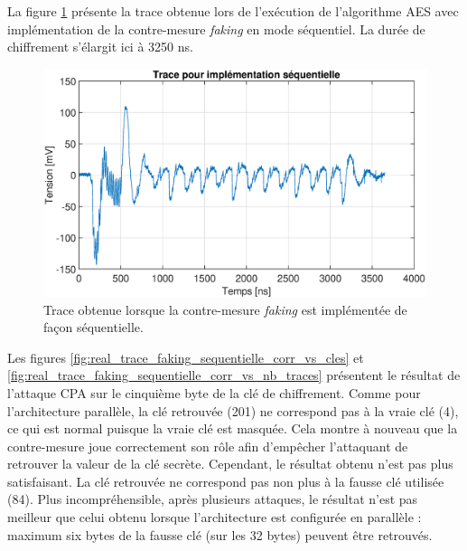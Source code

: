 \documentclass[oneside]{book}
\begin{document}
La figure \ref{fig:real_trace_faking_sequentielle} présente la trace obtenue lors de l'exécution de l'algorithme AES avec implémentation de la contre-mesure \textit{faking} en mode séquentiel. La durée de chiffrement s'élargit ici à 3250 \si{\nano\second}.

\begin{figure}[htbp]
    \hspace{-1cm}
    \includegraphics[scale=0.54]{image/real_trace_faking_sequentielle}
    \caption{Trace obtenue lorsque la contre-mesure \textit{faking} est implémentée de façon séquentielle.}
    \label{fig:real_trace_faking_sequentielle} 
\end{figure}

Les figures \ref{fig:real_trace_faking_sequentielle_corr_vs_cles} et \ref{fig:real_trace_faking_sequentielle_corr_vs_nb_traces} présentent le résultat de l'attaque CPA sur le cinquième byte de la clé de chiffrement. Comme pour l'architecture parallèle, la clé retrouvée (201) ne correspond pas à la vraie clé (4), ce qui est normal puisque la vraie clé est masquée. Cela montre à nouveau que la contre-mesure joue correctement son rôle afin d'empêcher l'attaquant de retrouver la valeur de la clé secrète. Cependant, le résultat obtenu n'est pas plus satisfaisant. La clé retrouvée ne correspond pas non plus à la fausse clé utilisée (84). Plus incompréhensible, après plusieurs attaques, le résultat n'est pas meilleur que celui obtenu lorsque l'architecture est configurée en parallèle : maximum six bytes de la fausse clé (sur les 32 bytes) peuvent être retrouvés.
\end{document}
